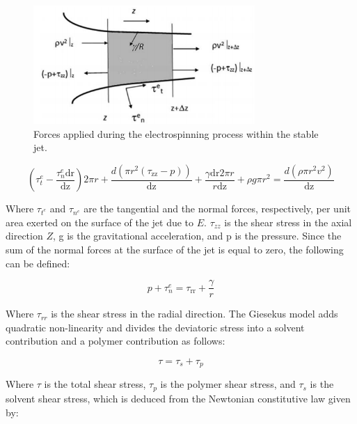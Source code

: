 \begin{figure}[th]
\centering
\includegraphics[width=0.75\textwidth]{./Figures/electrospinningForces.png}
\decoRule
\caption[Electrospinning Forces]{Forces applied during the electrospinning process within the stable jet. \cite{Ismail2016}}
\label{fig:electrospinningForces}
\end{figure}

\begin{equation}
\left(\tau _t^e-\frac{\tau _n^e \text{dr}}{\text{dz}}\right) 2 \pi  r+\frac{d \left(\pi  r^2
   \left(\tau _{\text{zz}}-p\right)\right)}{\text{dz}}+\frac{\gamma  \text{dr} 2 \pi  r}{r
   \text{dz}}+\rho  g \pi  r^2=\frac{d \left(\rho  \pi  r^2 v^2\right)}{\text{dz}}
\label{eq:linearMomentum}
\end{equation}

Where $\tau_{t^e}$ and $\tau_{n^e}$ are the tangential and the normal forces, respectively, per unit area exerted on the surface of the jet due to $E$. $\tau_{zz}$ is the shear stress in the axial direction $Z$, g is the gravitational acceleration, and p is the pressure. Since the sum of the normal forces at the surface of the jet is equal to zero, the following can be defined:

\begin{equation}
p+\tau _n^e=\tau _{\text{rr}}+\frac{\gamma }{r}
\label{eq:sumNormalForces}
\end{equation}

Where $\tau_{rr}$ is the shear stress in the radial direction. The Giesekus model adds quadratic non-linearity and divides the deviatoric stress into a solvent contribution and a polymer contribution \cite{Hinch} as follows:

\begin{equation}
\tau =\tau _s+\tau _p
\label{eq:shearStress}
\end{equation}

Where $\tau$ is the total shear stress, $\tau_{p}$ is the polymer shear stress, and $\tau_{s}$ is the solvent shear stress, which is deduced from the Newtonian constitutive law given by:

